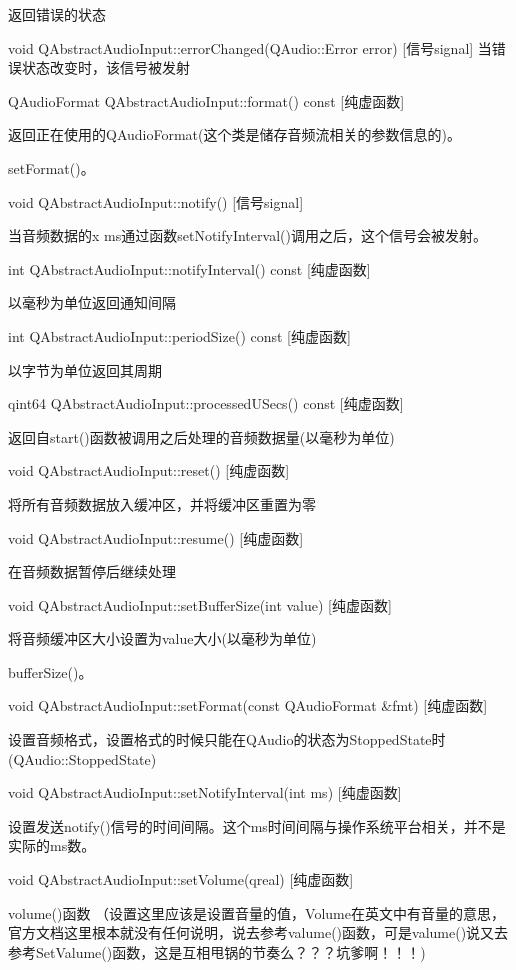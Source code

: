 返回错误的状态

void QAbstractAudioInput::errorChanged(QAudio::Error error) [信号signal]
当错误状态改变时，该信号被发射

QAudioFormat QAbstractAudioInput::format() const [纯虚函数]

返回正在使用的QAudioFormat(这个类是储存音频流相关的参数信息的)。

\begin{seeAlso}
setFormat()。
\end{seeAlso}

void QAbstractAudioInput::notify() [信号signal]

当音频数据的x ms通过函数setNotifyInterval()调用之后，这个信号会被发射。

int QAbstractAudioInput::notifyInterval() const [纯虚函数]

以毫秒为单位返回通知间隔

int QAbstractAudioInput::periodSize() const [纯虚函数]

以字节为单位返回其周期

qint64 QAbstractAudioInput::processedUSecs() const [纯虚函数]

返回自start()函数被调用之后处理的音频数据量(以毫秒为单位)

void QAbstractAudioInput::reset() [纯虚函数]

将所有音频数据放入缓冲区，并将缓冲区重置为零

void QAbstractAudioInput::resume() [纯虚函数]

在音频数据暂停后继续处理

void QAbstractAudioInput::setBufferSize(int value) [纯虚函数]

将音频缓冲区大小设置为value大小(以毫秒为单位) 

\begin{seeAlso}
bufferSize()。
\end{seeAlso}

void QAbstractAudioInput::setFormat(const QAudioFormat \&fmt) [纯虚函数]

设置音频格式，设置格式的时候只能在QAudio的状态为StoppedState时(QAudio::StoppedState)

void QAbstractAudioInput::setNotifyInterval(int ms) [纯虚函数]

设置发送notify()信号的时间间隔。这个ms时间间隔与操作系统平台相关，并不是实际的ms数。

void QAbstractAudioInput::setVolume(qreal) [纯虚函数]

\begin{seeAlso}
volume()函数 （设置这里应该是设置音量的值，Volume在英文中有音量的意思，官方文档这里根本就没有任何说明，说去参考valume()函数，可是valume()说又去参考SetValume()函数，这是互相甩锅的节奏么？？？坑爹啊！！！)
\end{seeAlso}

